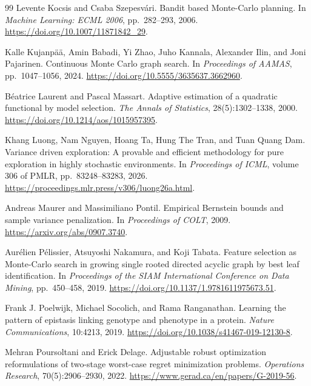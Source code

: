 \documentclass{article}
\theoremstyle{plain}
\theoremstyle{definition}
\begin{document}
\begin{thebibliography}{99}
Levente Kocsis and Csaba Szepesv\'ari.
Bandit based Monte-Carlo planning.
In \emph{Machine Learning: ECML 2006}, pp.\ 282--293, 2006.
\url{https://doi.org/10.1007/11871842_29}.

Kalle Kujanp\"a\"a, Amin Babadi, Yi Zhao, Juho Kannala, Alexander Ilin, and Joni Pajarinen.
Continuous Monte Carlo graph search.
In \emph{Proceedings of AAMAS}, pp.\ 1047--1056, 2024.
\url{https://doi.org/10.5555/3635637.3662960}.

B\'eatrice Laurent and Pascal Massart.
Adaptive estimation of a quadratic functional by model selection.
\emph{The Annals of Statistics}, 28(5):1302--1338, 2000.
\url{https://doi.org/10.1214/aos/1015957395}.

Khang Luong, Nam Nguyen, Hoang Ta, Hung The Tran, and Tuan Quang Dam.
Variance driven exploration: A provable and efficient methodology for pure exploration in highly stochastic environments.
In \emph{Proceedings of ICML}, volume 306 of PMLR, pp.\ 83248--83283, 2026.
\url{https://proceedings.mlr.press/v306/luong26a.html}.

Andreas Maurer and Massimiliano Pontil.
Empirical Bernstein bounds and sample variance penalization.
In \emph{Proceedings of COLT}, 2009.
\url{https://arxiv.org/abs/0907.3740}.

Aur\'elien P\'elissier, Atsuyoshi Nakamura, and Koji Tabata.
Feature selection as Monte-Carlo search in growing single rooted directed acyclic graph by best leaf identification.
In \emph{Proceedings of the SIAM International Conference on Data Mining}, pp.\ 450--458, 2019.
\url{https://doi.org/10.1137/1.9781611975673.51}.

Frank J. Poelwijk, Michael Socolich, and Rama Ranganathan.
Learning the pattern of epistasis linking genotype and phenotype in a protein.
\emph{Nature Communications}, 10:4213, 2019.
\url{https://doi.org/10.1038/s41467-019-12130-8}.

Mehran Poursoltani and Erick Delage.
Adjustable robust optimization reformulations of two-stage worst-case regret minimization problems.
\emph{Operations Research}, 70(5):2906--2930, 2022.
\url{https://www.gerad.ca/en/papers/G-2019-56}.


\end{thebibliography}
\end{document}
